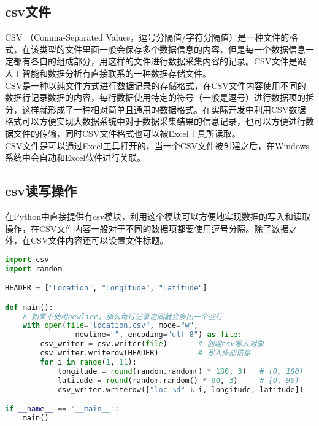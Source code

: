 \subsection{csv文件}

CSV （Comma-Separated Values，逗号分隔值/字符分隔值）是一种文件的格式，在该类型的文件里面一般会保存多个数据信息的内容，但是每一个数据信息一定都有各自的组成部分，用这样的文件进行数据采集内容的记录。CSV文件是跟人工智能和数据分析有直接联系的一种数据存储文件。\\

CSV是一种以纯文件方式进行数据记录的存储格式，在CSV文件内容使用不同的数据行记录数据的内容，每行数据使用特定的符号（一般是逗号）进行数据项的拆分，这样就形成了一种相对简单且通用的数据格式。在实际开发中利用CSV数据格式可以方便实现大数据系统中对于数据采集结果的信息记录，也可以方便进行数据文件的传输，同时CSV文件格式也可以被Excel工具所读取。\\

CSV文件是可以通过Excel工具打开的，当一个CSV文件被创建之后，在Windows系统中会自动和Excel软件进行关联。\\

\subsection{csv读写操作}

在Python中直接提供有csv模块，利用这个模块可以方便地实现数据的写入和读取操作，在CSV文件内容一般对于不同的数据项都要使用逗号分隔。除了数据之外，在CSV文件内容还可以设置文件标题。\\


\begin{lstlisting}[language=Python]
import csv
import random

HEADER = ["Location", "Longitude", "Latitude"]

def main():
    # 如果不使用newline，那么每行记录之间就会多出一个空行
    with open(file="location.csv", mode="w", 
                newline="", encoding="utf-8") as file:
        csv_writer = csv.writer(file)       # 创建csv写入对象
        csv_writer.writerow(HEADER)         # 写入头部信息
        for i in range(1, 11):
            longitude = round(random.random() * 180, 3)   # [0, 180)
            latitude = round(random.random() * 90, 3)     # [0, 90)
            csv_writer.writerow(["loc-%d" % i, longitude, latitude])

if __name__ == "__main__":
    main()
\end{lstlisting}


